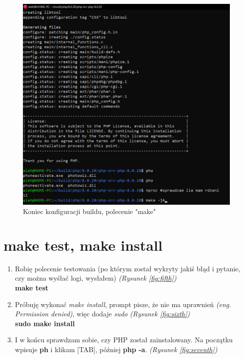 \documentclass[a4paper,12pt,oneside]{report} %
\begin{document}
\begin{figure}[h]
    \includegraphics[width=16cm]{e9.png}
	\caption{Koniec konfiguracji buildu, polecenie "make"}
    \label{fig:fourth}
\end{figure}


\section{make test, make install}


\begin{enumerate}
    \item Robię polecenie testowania (po którym został wykryty jakiś błąd i pytanie, czy można wyśłać logi, wysłałem) \textit{(Rysunek \ref{fig:fifth})} \\ \textbf{make test}
    \item Próbuję wykonać \textit{make install}, prompt pisze, że nie ma uprawnień \textit{(eng. Permission denied)}, więc dodaje \textit{sudo} \textit{(Rysunek \ref{fig:sixth})} \\ \textbf{sudo make install}
    \item I w końcu sprawdzam sobie, czy PHP został zainstalowany. Na początku wpisuje \textbf{ph} i klikam [TAB], później \textbf{php -a}. \textit{(Rysunek \ref{fig:seventh})}
\end{enumerate}
\end{document}
